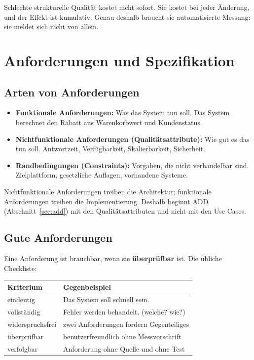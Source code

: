 \documentclass[12pt, a4paper]{article}
\begin{document}
\begin{notebox}
Schlechte strukturelle Qualität kostet nicht sofort. Sie kostet bei jeder Änderung,
und der Effekt ist kumulativ. Genau deshalb braucht sie automatisierte Messung: sie
meldet sich nicht von allein.
\end{notebox}

\section{Anforderungen und Spezifikation}

\subsection{Arten von Anforderungen}

\begin{itemize}
  \item \textbf{Funktionale Anforderungen:} Was das System tun soll.
        \glqq{}Das System berechnet den Rabatt aus Warenkorbwert und Kundenstatus.\grqq{}
  \item \textbf{Nichtfunktionale Anforderungen (Qualitätsattribute):} Wie gut es das
        tun soll. Antwortzeit, Verfügbarkeit, Skalierbarkeit, Sicherheit.
  \item \textbf{Randbedingungen (Constraints):} Vorgaben, die nicht verhandelbar sind.
        Zielplattform, gesetzliche Auflagen, vorhandene Systeme.
\end{itemize}

Nichtfunktionale Anforderungen treiben die Architektur; funktionale Anforderungen
treiben die Implementierung. Deshalb beginnt ADD (Abschnitt~\ref{sec:add}) mit den
Qualitätsattributen und nicht mit den Use Cases.

\subsection{Gute Anforderungen}

Eine Anforderung ist brauchbar, wenn sie \textbf{überprüfbar} ist. Die übliche
Checkliste:

\begin{center}
\begin{tabular}{ll}
\hline
\textbf{Kriterium} & \textbf{Gegenbeispiel} \\
\hline
eindeutig      & \glqq{}Das System soll schnell sein.\grqq{} \\
vollständig    & \glqq{}Fehler werden behandelt.\grqq{} (welche? wie?) \\
widerspruchsfrei & zwei Anforderungen fordern Gegenteiliges \\
überprüfbar    & \glqq{}benutzerfreundlich\grqq{} ohne Messvorschrift \\
verfolgbar     & Anforderung ohne Quelle und ohne Test \\
\hline
\end{tabular}
\end{center}
\end{document}
